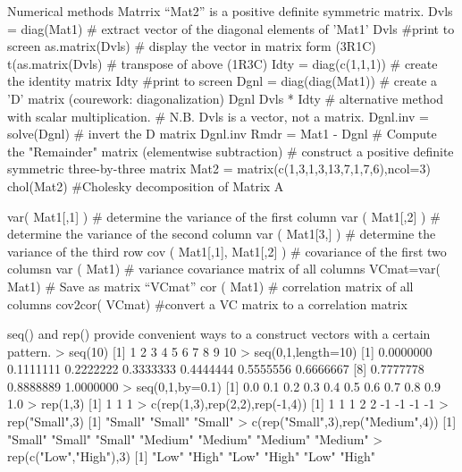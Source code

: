 Numerical methods
Matrrix “Mat2” is a positive definite symmetric matrix.
Dvls = diag(Mat1)           	             # extract vector of the diagonal elements of 'Mat1'
Dvls                                                        #print to screen
as.matrix(Dvls)                         	             # display the vector in matrix form (3R1C)
t(as.matrix(Dvls)           	             # transpose of above              (1R3C)
Idty = diag(c(1,1,1))                            # create the identity matrix
Idty                                                        #print to screen
Dgnl = diag(diag(Mat1))              # create a 'D' matrix               (courework: diagonalization)
Dgnl                                                       
Dvls * Idty           	          	             # alternative method with scalar multiplication.
           	          	          	             # N.B.  Dvls is a vector, not a matrix.
Dgnl.inv = solve(Dgnl)                            # invert the D matrix
Dgnl.inv                           
Rmdr = Mat1 - Dgnl           	             # Compute the "Remainder" matrix (elementwise subtraction)
# construct a positive definite symmetric three-by-three matrix
Mat2 = matrix(c(1,3,1,3,13,7,1,7,6),ncol=3)
chol(Mat2)           	          	             #Cholesky decomposition of Matrix A
 
 
 
var( Mat1[,1] )                                          # determine the variance of the first column
var ( Mat1[,2] )                                          # determine the variance of the second column
var ( Mat1[3,] )                                          # determine the variance of the third row
cov ( Mat1[,1], Mat1[,2] )              # covariance of the first two columsn
var ( Mat1)                                          # variance covariance matrix of all columns
VCmat=var( Mat1)                            # Save as matrix “VCmat”
cor ( Mat1)                                          # correlation matrix of all columns
cov2cor( VCmat)                            #convert a VC matrix to a correlation matrix
 
seq() and rep() provide convenient ways to a construct vectors with a certain pattern. 
> seq(10) 
 [1]  1  2  3  4  5  6  7  8  9 10 
> seq(0,1,length=10) 
 [1] 0.0000000 0.1111111 0.2222222 0.3333333 0.4444444 0.5555556 0.6666667 
 [8] 0.7777778 0.8888889 1.0000000 
> seq(0,1,by=0.1) 
 [1] 0.0 0.1 0.2 0.3 0.4 0.5 0.6 0.7 0.8 0.9 1.0 
> rep(1,3) 
[1] 1 1 1 
> c(rep(1,3),rep(2,2),rep(-1,4)) 
[1]  1  1  1  2  2 -1 -1 -1 -1 
> rep("Small",3) 
[1] "Small" "Small" "Small" 
> c(rep("Small",3),rep("Medium",4)) 
[1] "Small"  "Small"  "Small"  "Medium" "Medium" "Medium" "Medium" 
> rep(c("Low","High"),3) 
[1] "Low"  "High" "Low"  "High" "Low"  "High"

